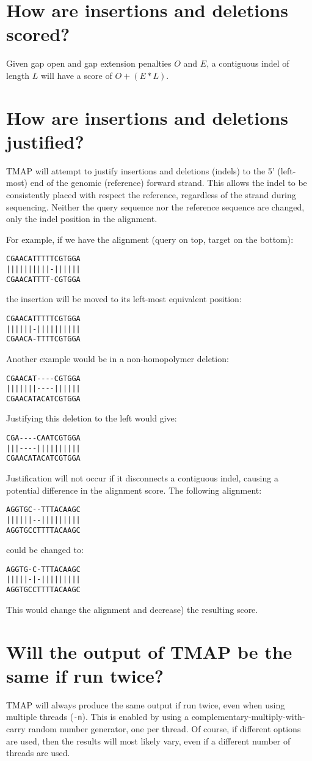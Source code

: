 \documentclass[a4paper,12pt]{book}
\newcommand{\TT}[1]{{\tt #1}} %
\begin{document}
\section{How are insertions and deletions scored?}
\label{sec:indel-scoring}
Given gap open and gap extension penalties $O$ and $E$, a contiguous indel of length $L$ will have a score of $O + (E * L)$.

\section{How are insertions and deletions justified?}
\label{sec:indel-justification}
TMAP will attempt to justify insertions and deletions (indels) to the 5' (left-most) end of the genomic (reference) forward strand.
This allows the indel to be consistently placed with respect the reference, regardless of the strand during sequencing.
Neither the query sequence nor the reference sequence are changed, only the indel position in the alignment.

For example, if we have the alignment (query on top, target on the bottom):
\begin{verbatim}
CGAACATTTTTCGTGGA
||||||||||-||||||
CGAACATTTT-CGTGGA
\end{verbatim}
the insertion will be moved to its left-most equivalent position:
\begin{verbatim}
CGAACATTTTTCGTGGA
||||||-||||||||||
CGAACA-TTTTCGTGGA
\end{verbatim}
Another example would be in a non-homopolymer deletion: 
\begin{verbatim}
CGAACAT----CGTGGA
|||||||----||||||
CGAACATACATCGTGGA
\end{verbatim}
Justifying this deletion to the left would give:
\begin{verbatim}
CGA----CAATCGTGGA
|||----||||||||||
CGAACATACATCGTGGA
\end{verbatim}
Justification will not occur if it disconnects a contiguous indel, causing a potential difference in the alignment score.
The following alignment:
\begin{verbatim}
AGGTGC--TTTACAAGC
||||||--|||||||||
AGGTGCCTTTTACAAGC
\end{verbatim}
could be changed to: 
\begin{verbatim}
AGGTG-C-TTTACAAGC
|||||-|-|||||||||
AGGTGCCTTTTACAAGC
\end{verbatim}
This would change the alignment and decrease) the resulting score.

\section{Will the output of TMAP be the same if run twice?}
TMAP will always produce the same output if run twice, even when using multiple threads (\TT{-n}).
This is enabled by using a complementary-multiply-with-carry random number generator, one per thread.
Of course, if different options are used, then the results will most likely vary, even if a different number of threads are used.
\end{document}
